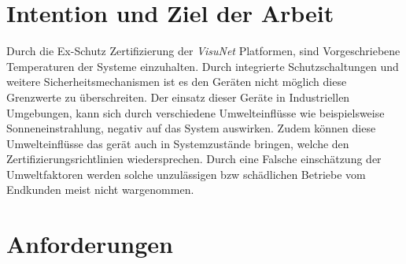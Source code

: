 \section{Intention und Ziel der Arbeit}
Durch die Ex-Schutz Zertifizierung der \textit{VisuNet} Platformen, sind Vorgeschriebene Temperaturen der Systeme einzuhalten. Durch integrierte Schutzschaltungen und weitere Sicherheitsmechanismen ist es den Geräten nicht möglich diese Grenzwerte zu überschreiten. Der einsatz dieser Geräte in Industriellen Umgebungen, kann sich durch verschiedene Umwelteinflüsse wie beispielsweise Sonneneinstrahlung, negativ auf das System auswirken. Zudem können diese Umwelteinflüsse das gerät auch in Systemzustände bringen, welche den Zertifizierungsrichtlinien wiedersprechen. Durch eine Falsche einschätzung der Umweltfaktoren werden solche unzulässigen bzw schädlichen Betriebe vom Endkunden meist nicht wargenommen.\\   


\section{Anforderungen}